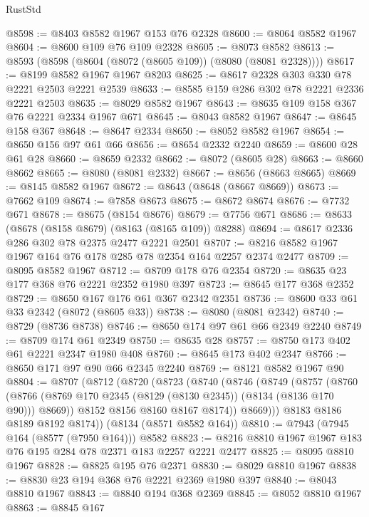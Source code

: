 \begin{lexlean}{RustStd}
\begin{coremodule}
@8598 := @8403 @8582 @1967 @153 @76 @2328
@8600 := @8064 @8582 @1967
@8604 := @8600 @109 @76 @109 @2328
@8605 := @8073 @8582
@8613 := @8593 (@8598 (@8604 (@8072 (@8605 @109)) (@8080 (@8081 @2328))))
@8617 := @8199 @8582 @1967 @1967 @8203
@8625 := @8617 @2328 @303 @330 @78 @2221 @2503 @2221 @2539
@8633 := @8585 @159 @286 @302 @78 @2221 @2336 @2221 @2503
@8635 := @8029 @8582 @1967
@8643 := @8635 @109 @158 @367 @76 @2221 @2334 @1967 @671
@8645 := @8043 @8582 @1967
@8647 := @8645 @158 @367
@8648 := @8647 @2334
@8650 := @8052 @8582 @1967
@8654 := @8650 @156 @97 @61 @66
@8656 := @8654 @2332 @2240
@8659 := @8600 @28 @61 @28
@8660 := @8659 @2332
@8662 := @8072 (@8605 @28)
@8663 := @8660 @8662
@8665 := @8080 (@8081 @2332)
@8667 := @8656 (@8663 @8665)
@8669 := @8145 @8582 @1967
@8672 := @8643 (@8648 (@8667 @8669))
@8673 := @7662 @109
@8674 := @7858 @8673
@8675 := @8672 @8674
@8676 := @7732 @671
@8678 := @8675 (@8154 @8676)
@8679 := @7756 @671
@8686 := @8633 (@8678 (@8158 @8679) (@8163 (@8165 @109)) @8288)
@8694 := @8617 @2336 @286 @302 @78 @2375 @2477 @2221 @2501
@8707 := @8216 @8582 @1967 @1967 @164 @76 @178 @285 @78 @2354 @164 @2257 @2374 @2477
@8709 := @8095 @8582 @1967
@8712 := @8709 @178 @76 @2354
@8720 := @8635 @23 @177 @368 @76 @2221 @2352 @1980 @397
@8723 := @8645 @177 @368 @2352
@8729 := @8650 @167 @176 @61 @367 @2342 @2351
@8736 := @8600 @33 @61 @33 @2342 (@8072 (@8605 @33))
@8738 := @8080 (@8081 @2342)
@8740 := @8729 (@8736 @8738)
@8746 := @8650 @174 @97 @61 @66 @2349 @2240
@8749 := @8709 @174 @61 @2349
@8750 := @8635 @28
@8757 := @8750 @173 @402 @61 @2221 @2347 @1980 @408
@8760 := @8645 @173 @402 @2347
@8766 := @8650 @171 @97 @90 @66 @2345 @2240
@8769 := @8121 @8582 @1967 @90
@8804 := @8707
    (@8712
      (@8720
        (@8723
          (@8740
            (@8746
              (@8749
                (@8757
                  (@8760
                    (@8766 (@8769 @170 @2345 (@8129 (@8130 @2345)) (@8134 (@8136 @170 @90))) @8669))
                  @8152
                  @8156
                  @8160
                  @8167
                  @8174))
              @8669)))
        @8183
        @8186
        @8189
        @8192
        @8174))
    (@8134 (@8571 @8582 @164))
@8810 := @7943 (@7945 @164 (@8577 (@7950 @164))) @8582
@8823 := @8216 @8810 @1967 @1967 @183 @76 @195 @284 @78 @2371 @183 @2257 @2221 @2477
@8825 := @8095 @8810 @1967
@8828 := @8825 @195 @76 @2371
@8830 := @8029 @8810 @1967
@8838 := @8830 @23 @194 @368 @76 @2221 @2369 @1980 @397
@8840 := @8043 @8810 @1967
@8843 := @8840 @194 @368 @2369
@8845 := @8052 @8810 @1967
@8863 := @8845
    @167

\end{coremodule}
\end{lexlean}
